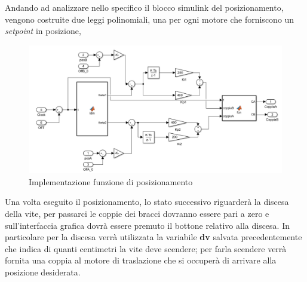 Andando ad analizzare nello specifico il blocco simulink del posizionamento, vengono costruite due leggi polinomiali, una per ogni motore che forniscono un \textit{setpoint} in posizione,
\begin{figure}[ht]
	\begin{center}
		\includegraphics[scale=0.6]{Immagini/Sperimentale/LdmPosizionamento}
		\caption{Implementazione funzione di posizionamento}
		\label{fig:ImpPos}
	\end{center}
\end{figure}
Una volta eseguito il posizionamento, lo stato successivo riguarderà la discesa della vite, per passarci le coppie dei bracci dovranno essere pari a zero e sull'interfaccia grafica dovrà essere premuto il bottone relativo alla discesa. In particolare per la discesa verrà utilizzata la variabile \textbf{dv} salvata precedentemente che indica di quanti centimetri la vite deve scendere; per farla scendere verrà fornita una coppia al motore di traslazione che si occuperà di arrivare alla posizione desiderata.
